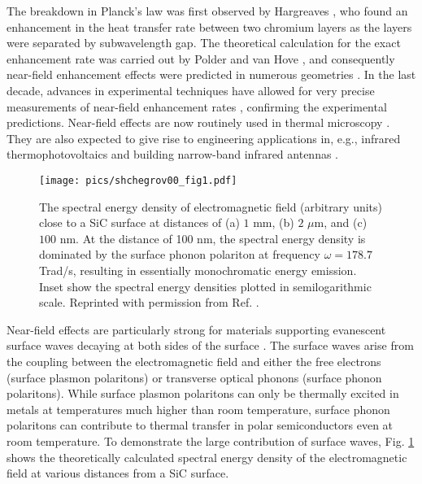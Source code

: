 The breakdown in Planck's law was first observed by Hargreaves \cite{hargreaves69}, who found an enhancement in the heat transfer rate between two chromium layers as the layers were separated by subwavelength gap. The theoretical calculation for the exact enhancement rate was carried out by Polder and van Hove \cite{polder71}, and consequently near-field enhancement effects were predicted in numerous geometries \cite{loomis94,pendry99,carminati99,shchegrov00,mulet01,volokitin01}. In the last decade, advances in experimental techniques have allowed for very precise measurements of near-field enhancement rates \cite{}, confirming the experimental predictions. Near-field effects are now routinely used in thermal microscopy \cite{majumdar99,muller-hirsch99,kittel05,kittel08}. They are also expected to give rise to engineering applications in, e.g., infrared thermophotovoltaics \cite{dimatteo01,narayanaswamy03,laroche06} and building narrow-band infrared antennas \cite{greffet02}. 

\begin{figure}
\begin{center}
 \texttt{[image: pics/shchegrov00\_fig1.pdf]}
 \caption{The spectral energy density of electromagnetic field (arbitrary units) close to a SiC surface at distances of (a) $1$ mm, (b) $2$ $\mu$m, and (c) $100$ nm. At the distance of 100 nm, the spectral energy density is dominated by the surface phonon polariton at frequency $\omega=178.7$ Trad/s, resulting in essentially monochromatic energy emission. Inset show the spectral energy densities plotted in semilogarithmic scale. Reprinted with permission from Ref. \cite{shchegrov00}.}
\label{fig:intro_shchegrov}
\end{center}
\end{figure} 

Near-field effects are particularly strong for materials supporting evanescent surface waves decaying at both sides of the surface \cite{shchegrov00}. The surface waves arise from the coupling between the electromagnetic field and either the free electrons (surface plasmon polaritons) or transverse optical phonons (surface phonon polaritons). While surface plasmon polaritons can only be thermally excited in metals at temperatures much higher than room temperature, surface phonon polaritons can contribute to thermal transfer in polar semiconductors even at room temperature. To demonstrate the large contribution of surface waves, Fig. \ref{fig:intro_shchegrov} shows the theoretically calculated \cite{shchegrov00} spectral energy density of the electromagnetic field at various distances from a SiC surface.


